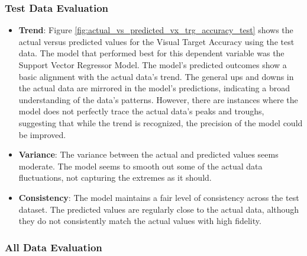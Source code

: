 \subsubsection*{Test Data Evaluation}

\begin{itemize}
    \item \textbf{Trend}: Figure \ref{fig:actual_vs_predicted_vx_trg_accuracy_test} shows the actual versus predicted values for the Visual Target Accuracy using the test data. The model that performed
          best for this dependent variable was the Support Vector Regressor Model. The model's predicted outcomes show a basic alignment with the actual data's trend. The general ups and downs in the actual data are
          mirrored in the model's predictions, indicating a broad understanding of the data's patterns. However, there are instances where the model does not perfectly trace the actual data's peaks and troughs,
          suggesting that while the trend is recognized, the precision of the model could be improved.

    \item \textbf{Variance}: The variance between the actual and predicted values seems moderate. The model seems to smooth out some of the actual data fluctuations, not capturing the extremes as it should.

    \item \textbf{Consistency}: The model maintains a fair level of consistency across the test dataset. The predicted values are regularly close to the actual data, although they do not consistently match the
          actual values with high fidelity.

\end{itemize}

\subsubsection*{All Data Evaluation}

